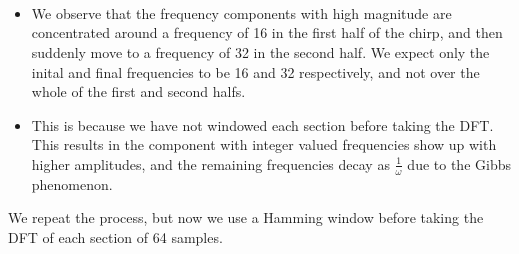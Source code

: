 \documentclass[11pt]{article}
\providecommand{\tightlist}{%
      \setlength{\itemsep}{0pt}\setlength{\parskip}{0pt}}
\begin{document}
	

    \begin{center}
    \end{center}
    { \hspace*{\fill} \\}
    
	

    \begin{center}
    \end{center}
    { \hspace*{\fill} \\}
    
	

    \begin{center}
    \end{center}
    { \hspace*{\fill} \\}
    
	
		
    \begin{itemize}
\tightlist
\item
  We observe that the frequency components with high magnitude are
  concentrated around a frequency of 16 in the first half of the chirp,
  and then suddenly move to a frequency of 32 in the second half. We
  expect only the inital and final frequencies to be 16 and 32
  respectively, and not over the whole of the first and second halfs.
\item
  This is because we have not windowed each section before taking the
  DFT. This results in the component with integer valued frequencies
  show up with higher amplitudes, and the remaining frequencies decay as
  \(\frac{1}{\omega}\) due to the Gibbs phenomenon.
\end{itemize}

We repeat the process, but now we use a Hamming window before taking the
DFT of each section of 64 samples.

	

	

	

    \begin{center}
    \end{center}
    { \hspace*{\fill} \\}
    
\end{document}
